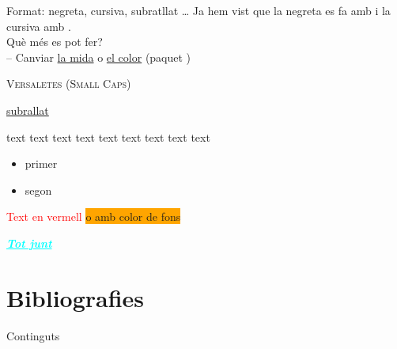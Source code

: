 \begin{frame}[fragile]{Format: negreta, cursiva, subratllat \dots}
\small{Ja hem vist que la negreta es fa amb  i la cursiva amb . \\
Què més es pot fer? \\
-- Canviar \href{https://www.overleaf.com/learn/latex/Font_sizes%2C_families%2C_and_styles}{la mida}
    o \href{https://www.overleaf.com/learn/latex/Using_colors_in_LaTeX}{el color} (paquet )
}
\begin{exampletwouptiny2}
\textsc{Versaletes (Small Caps)}

\underline{subrallat}

\tiny{text}
\scriptsize{text}
\footnotesize{text}
\small{text}
\normalsize{text}
\large{text}
\Large{text}
\LARGE{text}
\huge{text}
\end{exampletwouptiny2}
\begin{exampletwouptiny2}
\begin{itemize}
\color{blue}
\item primer 
\item segon
\end{itemize}

\textcolor{red}{Text en vermell}
\colorbox{orange}{o amb color de fons}

\textcolor{cyan}{\underline{\large{
    \textit{\textbf{Tot junt}}}}}
\end{exampletwouptiny2}

\end{frame}


\section{Bibliografies}
\begin{frame}{Continguts}
\begin{multicols}{2}
\tableofcontents[currentsection]
\end{multicols}
\end{frame}

